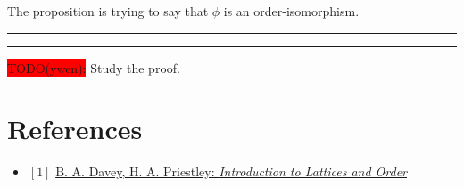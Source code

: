 \documentclass[12pt, letterpaper, oneside]{book}
\begin{document}
The proposition is trying to say that $\phi$ is an order-isomorphism.

\noindent\rule{10cm}{0.4pt}\rule{1cm}{10pt}

\colorbox{red}{TODO(ywen):} Study the proof.

%
%

\chapter*{References}

\begin{itemize}
  \item $[1]$ \href{https://www.cambridge.org/core/books/introduction-to-lattices-and-order/946458CB6638AF86D85BA00F5787F4F4}{B. A. Davey, H. A. Priestley: \it{Introduction to Lattices and Order}}
\end{itemize}
\end{document}
